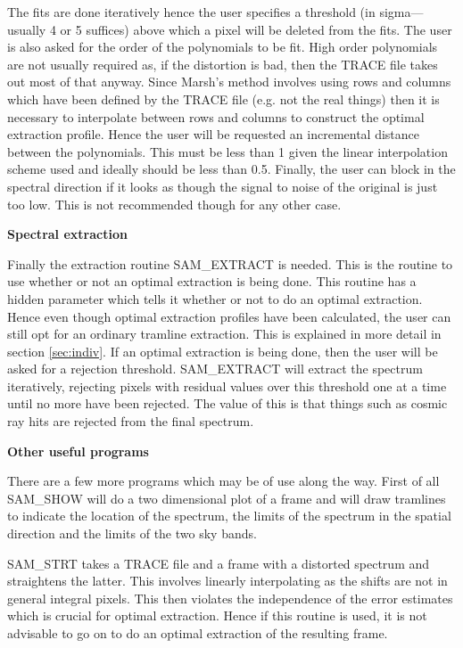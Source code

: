 The fits are done iteratively hence the user specifies a threshold (in
sigma---usually 4 or 5 suffices) above which a pixel will be deleted from the
fits.  The user is also asked for the order of the polynomials to be fit. 
High order polynomials are not usually required as, if the distortion is bad,
then the TRACE file takes out most of that anyway. Since Marsh's method
involves using rows and columns which have been defined by the TRACE file
(e.g. not the real things) then it is necessary to interpolate between rows
and columns to construct the optimal extraction profile.  Hence the user will
be requested an incremental distance between the polynomials.  This must be
less than 1 given the linear interpolation scheme used and ideally should be
less than 0.5.  Finally, the user can block in the spectral direction if it
looks as though the signal to noise of the original is just too low.  This is
not recommended though for any other case.

{\bf Spectral extraction}

Finally the extraction routine SAM\_EXTRACT is needed.  This is the routine to
use whether or not an optimal extraction is being done.  This routine has a
hidden parameter which tells it whether or not to do an optimal extraction.
Hence even though optimal extraction profiles have been calculated, the user
can still opt for an ordinary tramline extraction.  This is explained in more
detail in section \ref{sec:indiv}.  If an optimal extraction is being done,
then the user will be asked for a rejection threshold.  SAM\_EXTRACT will
extract the spectrum iteratively, rejecting pixels with residual values over
this threshold one at a time until no more have been rejected.  The value of
this is that things such as cosmic ray hits are rejected from the final
spectrum.

{\bf Other useful programs}

There are a few more programs which may be of use along the way.  First of all
SAM\_SHOW will do a two dimensional plot of a frame and will draw tramlines
to indicate the location of the spectrum, the limits of the spectrum in the
spatial direction and the limits of the two sky bands.

SAM\_STRT takes a TRACE file and a frame with a distorted spectrum and
straightens the latter.  This involves linearly interpolating as the shifts
are not in general integral pixels.  This then violates the independence of
the error estimates which is crucial for optimal extraction.  Hence if this
routine is used, it is not advisable to go on to do an optimal extraction of
the resulting frame.


